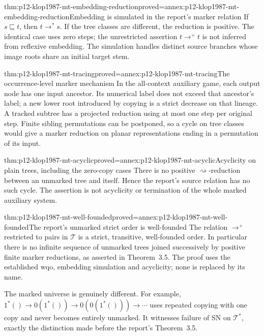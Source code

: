 \begin{hblemma}{thm:p12-klop1987-mt-embedding-reduction}{proved=annex:p12-klop1987-mt-embedding-reduction}{Embedding is simulated in the report's marker relation}
If \(s\sqsubseteq t\), then \(t\to^*s\). If the tree classes
are different, the reduction is positive. The identical case uses
zero steps; the unrestricted assertion \(t\to^+t\) is not inferred
from reflexive embedding. The simulation handles distinct source
branches whose image roots share an initial target stem.
\end{hblemma}

\begin{hblemma}{thm:p12-klop1987-mt-tracing}{proved=annex:p12-klop1987-mt-tracing}{The occurrence-level marker mechanism}
In the all-context auxiliary game, each output node has one input
ancestor. Its numerical label does not exceed that ancestor's label;
a new lower root introduced by copying is a strict decrease on that
lineage. A tracked subtree has a projected reduction using at most
one step per original step. Finite sibling permutations can be
postponed, so a cycle on tree classes would give a marker reduction
on planar representations ending in a permutation of its input.
\end{hblemma}

\begin{hbtheorem}{thm:p12-klop1987-mt-acyclic}{proved=annex:p12-klop1987-mt-acyclic}{Acyclicity on plain trees, including the zero-copy cases}
There is no positive \(\rightsquigarrow\)-reduction between an
unmarked tree and itself. Hence the report's source relation has
no such cycle. The assertion is not acyclicity or termination of
the whole marked auxiliary system.
\end{hbtheorem}

\begin{hbtheorem}{thm:p12-klop1987-mt-well-founded}{proved=annex:p12-klop1987-mt-well-founded}{The report's unmarked strict order is well-founded}
The relation \(\to^+\) restricted to pairs in \(\mathcal T\)
is a strict, transitive, well-founded order. In particular there is
no infinite sequence of unmarked trees joined successively by
positive finite marker reductions, as asserted in Theorem~3.5.
The proof uses the established wqo, embedding simulation and
acyclicity; none is replaced by its name.
\end{hbtheorem}

The marked universe is genuinely different. For example,
\(1^*()\to0(1^*())\to0(0(1^*()))\to\cdots\)
uses repeated copying with one copy and never becomes entirely
unmarked. It witnesses failure of SN on \(\mathcal T^*\), exactly
the distinction made before the report's Theorem~3.5.

